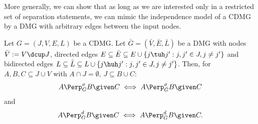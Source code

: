 More generally, we can show that as long as we are interested only in a restricted set of separation statements, we can mimic the independence model of a CDMG by a DMG with arbitrary edges between the input nodes.
\begin{Lem}\label{lem:CI_equivalence_CDMG_DMG}
  Let $G=(J,V,E,L)$ be a CDMG. 
  Let $\bar{G}=(\bar{V},\bar{E},\bar{L})$ be a DMG with nodes $\bar{V} := V \dcup J$, directed edges $E \subseteq \bar{E} \subseteq E \cup \{j \tuh j' : j, j' \in J, j \ne j'\}$ and bidirected edges $L \subseteq \bar{L} \subseteq L \cup \{j \huh j' : j, j' \in J, j \ne j'\}$.
  Then, for $A, B, C \subseteq J \cup V$ with $A \cap J = \emptyset$, $J \subseteq B \cup C$:
  $$A \Perp_G^\sigma B \given C \iff A \Perp_{\bar{G}}^\sigma B \given C$$
  and
  $$A \Perp_G^d B \given C \iff A \Perp_{\bar{G}}^d B \given C.$$
\end{Lem}
